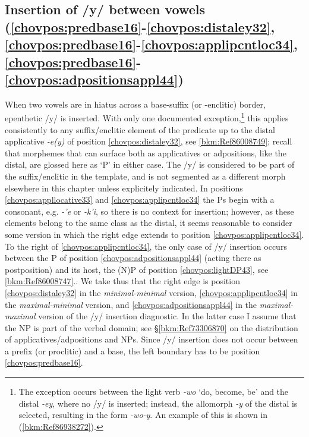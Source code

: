 \documentclass[output=paper]{langscibook}
\begin{document}
\subsection{Insertion of /y/ between vowels (\ref{chovpos:predbase16}{}-\ref{chovpos:distaley32}, \ref{chovpos:predbase16}{}-\ref{chovpos:applipcntloc34}, \ref{chovpos:predbase16}{}-\ref{chovpos:adpositionsappl44})}
\label{bkm:Ref89781621}
When two vowels are in hiatus across a base-suffix (or -enclitic) border, epenthetic /y/ is inserted. With only one documented exception,\footnote{The exception occurs between the light verb \textit{-wo} `do, become, be' and the distal \textit{-ey}, where no /y/ is inserted; instead, the allomorph \textit{-y} of the distal is selected, resulting in the form \textit{-wo-y}. An example of this is shown in (\ref{bkm:Ref86938272}).} this applies consistently to any suffix/enclitic element of the predicate up to the distal applicative \textit{-e(y)} of position \ref{chovpos:distaley32}, see \ref{bkm:Ref86008749}; recall that morphemes that can surface both as applicatives or adpositions, like the distal, are glossed here as `P' in either case. The /y/ is considered to be part of the suffix/enclitic in the template, and is not segmented as a different morph elsewhere in this chapter unless explicitely indicated. In positions \ref{chovpos:appllocative33} and \ref{chovpos:applipcntloc34} the Ps begin with a consonant, e.g. \textit{{}-'e} or \textit{{}-k'i}, so there is no context for insertion; however, as these elements belong to the same class as the distal, it seems reasonable to consider some version in which the right edge extends to position \ref{chovpos:applipcntloc34}. To the right of \ref{chovpos:applipcntloc34}, the only case of /y/ insertion occurs between the P of position \ref{chovpos:adpositionsappl44} (acting there as postposition) and its host, the (N)P of position \ref{chovpos:lightDP43}, see \ref{bkm:Ref86008747}.. We take thus that the right edge is position \ref{chovpos:distaley32} in the \textit{minimal-minimal} version, \ref{chovpos:applipcntloc34} in the \textit{maximal-minimal} version, and \ref{chovpos:adpositionsappl44} in the \textit{maximal-maximal} version of the /y/ insertion diagnostic. In the latter case I assume that the NP is part of the verbal domain; see §\ref{bkm:Ref73306870} on the distribution of applicatives/adpositions and NPs. Since /y/ insertion does not occur between a prefix (or proclitic) and a base, the left boundary has to be position \ref{chovpos:predbase16}.
\end{document}
